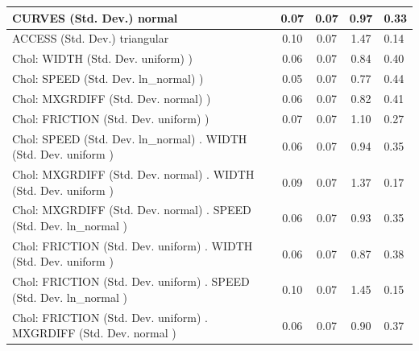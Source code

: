 \begin{table}
\begin{center}
\begin{tabular}{|l|l|c|c|c|l|}
			\hline
			CURVES (Std. Dev.) normal &  & 0.07 & 0.07 & 0.97 & 0.33 \\
			\hline
			ACCESS (Std. Dev.) triangular &  & 0.10 & 0.07 & 1.47 & 0.14 \\
			\hline
			 Chol: WIDTH (Std. Dev. uniform) ) &  & 0.06 & 0.07 & 0.84 & 0.40 \\
			\hline
			 Chol: SPEED (Std. Dev. ln_normal) ) &  & 0.05 & 0.07 & 0.77 & 0.44 \\
			\hline
			 Chol: MXGRDIFF (Std. Dev. normal) ) &  & 0.06 & 0.07 & 0.82 & 0.41 \\
			\hline
			 Chol: FRICTION (Std. Dev. uniform) ) &  & 0.07 & 0.07 & 1.10 & 0.27 \\
			\hline
			 Chol: SPEED (Std. Dev. ln_normal) . WIDTH (Std. Dev.   uniform ) &  & 0.06 & 0.07 & 0.94 & 0.35 \\
			\hline
			 Chol: MXGRDIFF (Std. Dev. normal) . WIDTH (Std. Dev.   uniform ) &  & 0.09 & 0.07 & 1.37 & 0.17 \\
			\hline
			 Chol: MXGRDIFF (Std. Dev. normal) . SPEED (Std. Dev.   ln_normal ) &  & 0.06 & 0.07 & 0.93 & 0.35 \\
			\hline
			 Chol: FRICTION (Std. Dev. uniform) . WIDTH (Std. Dev.   uniform ) &  & 0.06 & 0.07 & 0.87 & 0.38 \\
			\hline
			 Chol: FRICTION (Std. Dev. uniform) . SPEED (Std. Dev.   ln_normal ) &  & 0.10 & 0.07 & 1.45 & 0.15 \\
			\hline
			 Chol: FRICTION (Std. Dev. uniform) . MXGRDIFF (Std. Dev.   normal ) &  & 0.06 & 0.07 & 0.90 & 0.37 \\
			\hline
		\end{tabular}
	\end{center}
\end{table}
